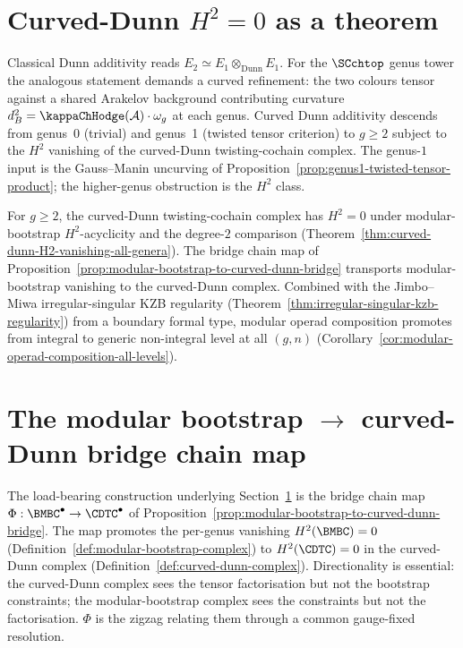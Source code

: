 \section{Curved-Dunn $H^{2}=0$ as a theorem}
\label{sec:part-viii-curved-dunn}

Classical Dunn additivity reads
$E_{2} \simeq E_{1} \otimes_{\mathrm{Dunn}} E_{1}$. For the $\SCchtop$
genus tower the analogous statement demands a curved refinement: the
two colours tensor against a shared Arakelov background contributing
curvature \(d_{B}^{2}=\kappaChHodge(\mathcal A)\cdot \omega_g\) at each
genus. Curved Dunn additivity descends from genus~0 (trivial) and genus~1
(twisted tensor criterion) to $g \ge 2$ subject to the $H^{2}$ vanishing
of the curved-Dunn twisting-cochain complex. The genus-$1$ input is the
Gauss--Manin uncurving of
Proposition~\ref{prop:genus1-twisted-tensor-product}; the higher-genus
obstruction is the $H^{2}$ class.

For \(g\ge2\), the curved-Dunn twisting-cochain complex has \(H^{2}=0\)
under modular-bootstrap \(H^2\)-acyclicity and the degree-\(2\)
comparison (Theorem~\ref{thm:curved-dunn-H2-vanishing-all-genera}).
The bridge chain map of
Proposition~\ref{prop:modular-bootstrap-to-curved-dunn-bridge}
transports modular-bootstrap vanishing to the curved-Dunn complex.
Combined with the Jimbo--Miwa irregular-singular KZB regularity
(Theorem~\ref{thm:irregular-singular-kzb-regularity}) from a boundary
formal type, modular operad composition promotes from integral to
generic non-integral level at all $(g,n)$
(Corollary~\ref{cor:modular-operad-composition-all-levels}).

\section{The modular bootstrap $\to$ curved-Dunn bridge chain map}
\label{sec:part-viii-bridge}

The load-bearing construction underlying
Section~\ref{sec:part-viii-curved-dunn} is the bridge chain map
$\Phi : \BMBC^{\bullet} \to \CDTC^{\bullet}$ of
Proposition~\ref{prop:modular-bootstrap-to-curved-dunn-bridge}.
The map promotes the per-genus vanishing $H^{2}(\BMBC) = 0$
(Definition~\ref{def:modular-bootstrap-complex}) to
$H^{2}(\CDTC) = 0$ in the curved-Dunn complex
(Definition~\ref{def:curved-dunn-complex}). Directionality is essential:
the curved-Dunn complex sees the tensor factorisation but not the
bootstrap constraints; the modular-bootstrap complex sees the
constraints but not the factorisation. $\Phi$ is the zigzag relating
them through a common gauge-fixed resolution.

